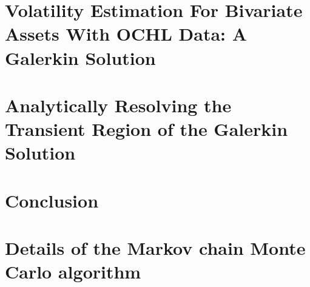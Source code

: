 \chapter{Volatility Estimation For Bivariate Assets With OCHL Data: A Galerkin Solution}


\chapter{Analytically Resolving the Transient Region of the Galerkin Solution}


\chapter{Conclusion}


\appendix %
\chapter{Details of the Markov chain Monte Carlo algorithm}


\nocite{*}

\singlespacing

\doublespacing

